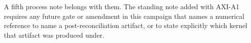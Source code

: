 \documentclass[11pt]{article}
\begin{document}
A fifth process note belongs with them. The standing note added with AXI-A1 requires any future gate or amendment in this campaign that names a numerical reference to name a post-reconciliation artifact, or to state explicitly which kernel that artifact was produced under.

\clearpage


\end{document}
